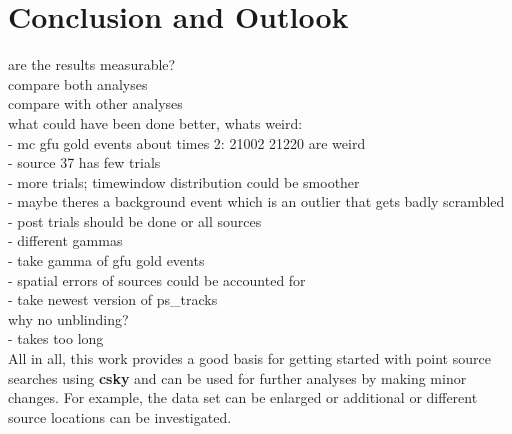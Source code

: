 \chapter{Conclusion and Outlook} \label{sec:outlook}
are the results measurable?\\
compare both analyses\\
compare with other analyses\\

what could have been done better, whats weird:\\
- mc gfu gold events about times 2: 21002 21220 are weird\\
- source 37 has few trials\\
- more trials; timewindow distribution could be smoother\\
- maybe theres a background event which is an outlier that gets badly scrambled\\
- post trials should be done or all sources\\
- different gammas\\
- take gamma of gfu gold events\\
- spatial errors of sources could be accounted for\\
- take newest version of ps\_tracks\\
why no unblinding?\\
- takes too long\\

All in all, this work provides a good basis for getting started with point source searches using \textbf{csky} and can be used for further analyses by making minor changes.
For example, the data set can be enlarged or additional or different source locations can be investigated.
